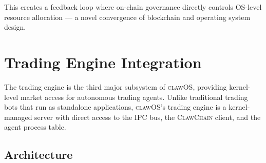 \documentclass{article}
\newcommand{\clawos}{\textsc{clawOS}}
\newcommand{\clawchain}{\textsc{ClawChain}}
\begin{document}
This creates a feedback loop where on-chain governance directly controls OS-level resource allocation — a novel convergence of blockchain and operating system design.

%
%

\section{Trading Engine Integration}
\label{sec:trading_integration}

The trading engine is the third major subsystem of \clawos{}, providing kernel-level market access for autonomous trading agents. Unlike traditional trading bots that run as standalone applications, \clawos{}'s trading engine is a kernel-managed server with direct access to the IPC bus, the \clawchain{} client, and the agent process table.

\subsection{Architecture}
\end{document}
